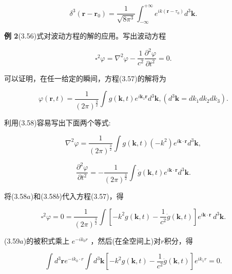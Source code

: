 \begin{equation*}
\delta^ {3} \left(\boldsymbol {r} - \boldsymbol {r} _ {0}\right) = \frac {1}{\sqrt {8 \pi^ {3}}} \int_ {- \infty} ^ {+ \infty} e ^ {i k (\boldsymbol {r} - \tau_ {0})} d ^ {3} \boldsymbol {k}.\tag{3.56}
\end{equation*}

\textbf{例 2}\quad (3.56)式对波动方程的解的应用。写出波动方程

\begin{equation*}
\square^ {2} \varphi = \nabla^ {2} \varphi - \frac {1}{c ^ {2}} \frac {\partial^ {2} \varphi}{\partial t ^ {2}} = 0.\tag{3.57}
\end{equation*}

可以证明，在任一给定的瞬间，方程(3.57)的解将为

\begin{equation*}
\varphi (\boldsymbol {r}, t) = \frac {1}{(2 \pi) ^ {\frac {3}{2}}} \int g (\boldsymbol {k}, t) e ^ {i \boldsymbol {k} _ {1} \boldsymbol {r}} d ^ {3} \boldsymbol {k}, (d ^ {3} \boldsymbol {k} = d k _ {1} d k _ {2} d k _ {3}).\tag{3.58}
\end{equation*}

利用(3.58)容易写出下面两个等式:

\begin{equation*}
\nabla^ {2} \varphi = \frac {1}{(2 \pi) ^ {\frac {3}{2}}} \int g (\boldsymbol {k}, t) (- k ^ {2}) e ^ {i \boldsymbol {k} \cdot \boldsymbol {r}} d ^ {3} \boldsymbol {k},\tag{3.58a}
\end{equation*}

\begin{equation*}
\frac {\partial^ {2} \varphi}{\partial t ^ {2}} = - \frac {1}{(2 \pi) ^ {\frac {3}{2}}} \int \ddot {g} (\boldsymbol {k}, t) e ^ {i \boldsymbol {k} \cdot \boldsymbol {r}} d ^ {3} \boldsymbol {k}.\tag{3.58b}
\end{equation*}

将(3.58$a$)和(3.58$b$)代入方程(3.57)，得

\begin{equation*}
\square^ {2} \varphi = 0 = \frac {1}{(2 \pi) ^ {\frac {3}{2}}} \int \left[ - k ^ {2} g (\boldsymbol {k}, t) - \frac {1}{c ^ {2}} \ddot {g} (\boldsymbol {k}, t) \right] e ^ {i \boldsymbol {k} \cdot \boldsymbol {r}}\, d ^ {3} \boldsymbol {k}.\tag{3.59a}
\end{equation*}

(3.59$a$)的被积式乘上 $e^{-ik_{0}r}$ ，然后(在全空间上)对$r$积分，得

\begin{equation*}
\int d ^ {3} \boldsymbol {r} e ^ {- i k _ {0} \cdot r} \int d ^ {3} \boldsymbol {k} \left[ - k ^ {2} g (\boldsymbol {k}, t) - \frac {1}{c ^ {2}} \ddot {g} (\boldsymbol {k}, t) \right] e ^ {i k _ {1} r} = 0.\tag{3.59b}
\end{equation*}


